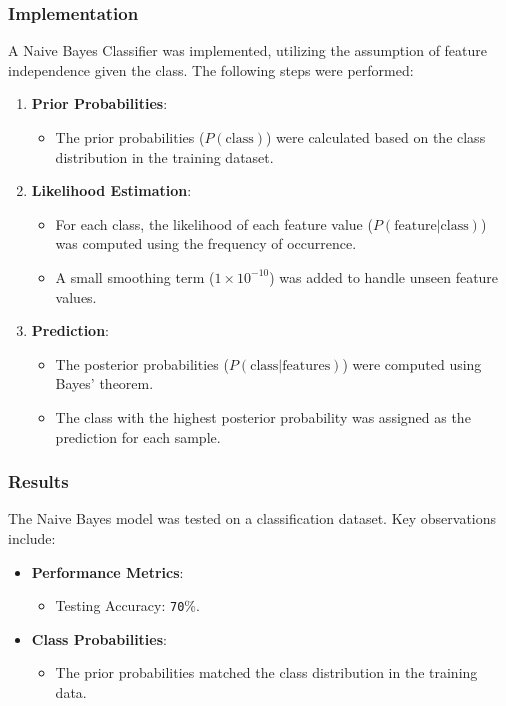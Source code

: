 \documentclass[12pt]{article}
\begin{document}
\subsubsection{Implementation}

A Naive Bayes Classifier was implemented, utilizing the assumption of feature independence given the class. The following steps were performed:

\begin{enumerate}
    \item \textbf{Prior Probabilities}:
    \begin{itemize}
        \item The prior probabilities (\(P(\text{class})\)) were calculated based on the class distribution in the training dataset.
    \end{itemize}

    \item \textbf{Likelihood Estimation}:
    \begin{itemize}
        \item For each class, the likelihood of each feature value (\(P(\text{feature} | \text{class})\)) was computed using the frequency of occurrence.
        \item A small smoothing term (\(1 \times 10^{-10}\)) was added to handle unseen feature values.
    \end{itemize}

    \item \textbf{Prediction}:
    \begin{itemize}
        \item The posterior probabilities (\(P(\text{class} | \text{features})\)) were computed using Bayes’ theorem.
        \item The class with the highest posterior probability was assigned as the prediction for each sample.
    \end{itemize}
\end{enumerate}

\subsubsection{Results}

The Naive Bayes model was tested on a classification dataset. Key observations include:

\begin{itemize}
    \item \textbf{Performance Metrics}:
    \begin{itemize}
        \item Testing Accuracy: \texttt{70}\%.
    \end{itemize}

    \item \textbf{Class Probabilities}:
    \begin{itemize}
        \item The prior probabilities matched the class distribution in the training data.
    \end{itemize}
\end{itemize}
\end{document}
